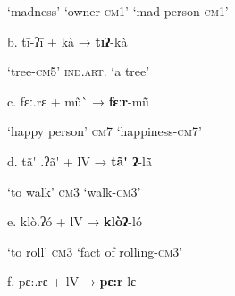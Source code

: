 \begin{styleindexi}
          ‘madness’                    ‘owner-\textsc{cm1}’                                  ‘mad person-\textsc{cm}1’
\end{styleindexi}

\begin{styleindexi}
      b.  tī-ʔī                      +      kà                          →                  \textbf{tīʔ}{}-kà   
\end{styleindexi}

\begin{styleindexi}
          ‘tree-\textsc{cm}5’                 \textsc{ind.art}.                                      ‘a tree’
\end{styleindexi}

\begin{styleindexi}
      c. fɛː.rɛ                    +     mũ\`{}                          →                 \textbf{fɛːr}{}-mũ\={}         
\end{styleindexi}

\begin{styleindexi}
          ‘happy person’          \textsc{cm}7                                              ‘happiness-\textsc{cm}7’      
\end{styleindexi}

\begin{styleindexi}
      d.  tã\'{} .ʔã\'{}                     +      lV                          →                  \textbf{tã\'{} ʔ}{}-lã\={}             
\end{styleindexi}

\begin{styleindexi}
          ‘to walk’                  \textsc{cm}3                                            ‘walk-\textsc{cm3}’
\end{styleindexi}

\begin{styleindexi}
      e.  klò.ʔó                    +      lV                            →                   \textbf{klòʔ}{}-ló              
\end{styleindexi}

\begin{styleindexi}
           ‘to roll’                    \textsc{cm}3                                              ‘fact of rolling-\textsc{cm}3’
\end{styleindexi}

\begin{styleindexi}
      f.    pɛ:.rɛ                 +      lV                          →                  \textbf{pɛ:r}{}-lɛ             
\end{styleindexi}

